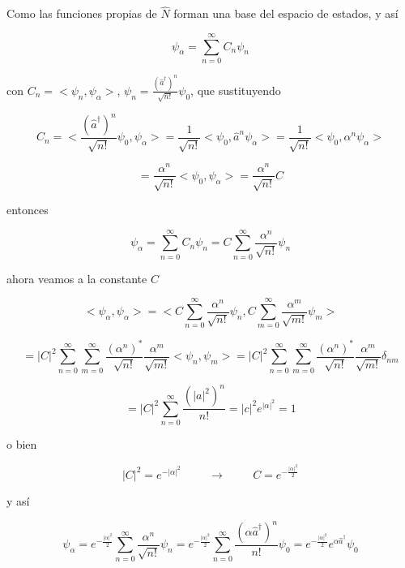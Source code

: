 \documentclass[12pt,a4paper]{article}
\begin{document}
\begin{enumerate}
Como las funciones propias de $\hat{N}$ forman una base del espacio de estados, y así

\begin{equation*}
    \psi_\alpha = \sum_{n = 0}^{\infty} C_n  \psi_n
\end{equation*}

con $C_n = <\psi_n , \psi_\alpha>$, $\psi_{n} = \frac{(\hat{a}^{\dagger})^{n}}{\sqrt{n!}} \psi_0$, que sustituyendo

\begin{equation*}
    C_n = <\frac{(\hat{a}^{\dagger})^{n}}{\sqrt{n!}} \psi_0,\psi_\alpha> = \frac{1}{\sqrt{n!}}<\psi_0, \hat{a}^{n} \psi_{\alpha}> = \frac{1}{\sqrt{n!}} <\psi_0, \alpha^n \psi_{\alpha}>
\end{equation*}

\begin{equation*}
    = \frac{\alpha^n}{\sqrt{n!}} <\psi_0, \psi_\alpha>= \frac{\alpha^n}{\sqrt{n!}} C
\end{equation*}

entonces

\begin{equation*}
    \psi_{\alpha} = \sum_{n=0}^{\infty} C_n \psi_n = C \sum_{n=0}^{\infty} \frac{\alpha^n}{\sqrt{n!}} \psi_n
\end{equation*}

ahora veamos a la constante $C$

\begin{equation*}
    <\psi_{\alpha}, \psi_{\alpha}> = <C\sum_{n=0}^{\infty} \frac{\alpha^n}{\sqrt{n!} }\psi_{n},C\sum_{m=0}^{\infty} \frac{\alpha^m}{\sqrt{m!} }\psi_{m}>
\end{equation*}

\begin{equation*}
    = |C|^2 \sum_{n=0}^{\infty} \sum_{m=0}^{\infty} \frac{(\alpha^{n})^{*}}{\sqrt{n!}} \frac{\alpha^{m}}{\sqrt{m!}} <\psi_{n}, \psi_{m}> = |C|^2 \sum_{n=0}^{\infty} \sum_{m=0}^{\infty}\frac{(\alpha^{n})^{*}}{\sqrt{n!}} \frac{\alpha^{m}}{\sqrt{m!}} \delta_{nm}
\end{equation*}

\begin{equation*}
    = |C|^2 \sum_{n=0}^{\infty} \frac{(|a|^2)^{n}}{n!} = |c|^2 e^{|\alpha|^2} = 1
\end{equation*}

o bien

\begin{equation*}
    |C|^2 = e^{- |\alpha|^2} \hspace{1cm} \rightarrow \hspace{1cm}  C= e^{- \frac{|\alpha|^2}{2}}
\end{equation*}

y así

\begin{equation*}
    \psi_{\alpha} = e^{-\frac{|\alpha|^2}{2}} \sum_{n=0}^{\infty} \frac{\alpha^n}{\sqrt{n!}} \psi_n = e^{-\frac{|\alpha|^2}{2}} \sum_{n=0}^{\infty} \frac{(\alpha\hat{a}^{\dagger})^n}{n!} \psi_0 = e^{-\frac{|\alpha|^2}{2}} e^{\alpha \hat{a}^{\dagger}} \psi_0
\end{equation*}
    
    
\end{enumerate}
\end{document}
